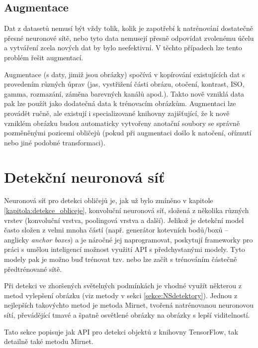 \subsection*{Augmentace}
Dat z datasetů nemusí být vždy tolik, kolik je zapotřebí k natrénování dostatečně přesné neuronové sítě, nebo tyto data nemusejí přesně odpovídat zvolenému účelu a vytváření zcela nových dat by bylo neefektivní. V těchto případech lze tento problém řešit augmentací.

Augmentace (s daty, jimiž jsou obrázky) spočívá v kopírování existujících dat s provedením různých úprav (jas, vystřižení části obrázu, otočení, kontrast, ISO, gamma, rozmazání, záměna barevných kanálů apod.). Takto nově vzniklá data pak lze použít jako dodatečná data k trénovacím obrázkům. Augmentaci lze provádět ručně, ale existují i specializované knihovny zajišťující, že k nově vzniklém obrázku budou automaticky vytvořeny anotační soubory se správně pozměněnými pozicemi obličejů (pokud při augmentaci došlo k natočení, oříznutí nebo jiné podobné transformaci).

\section{Detekční neuronová síť}
\label{sekce:detekcni_sit_navrh}
Neuronová síť pro detekci obličejů je, jak už bylo zmíněno v kapitole \ref{kapitola:detekce_obliceje}, konvoluční neuronová síť, složená z několika různých vrstev (konvoluční vrstva, poolingová vrstva a další). Jelikož je detekční model často složen z velmi mnoha částí (např. generátor kotevních bodů/boxů -- anglicky \emph{anchor boxes}) a je náročné jej naprogramovat, poskytují frameworky pro práci s umělou inteligencí možnost využití API s předchystanými modely. Tyto modely pak je možno buď trénovat tzv.  nebo lze začít s trénováním částečně předtrénované sítě.

Při detekci ve zhoršených světelných podmínkách je vhodné využít některou z metod vylepšení obrázku (viz metody v sekci \ref{sekce:NSdetektory}). Jednou z nejlepších takovýchto metod je metoda Mirnet, tvořená natrénovanou neuronovou sítí, převádějící tmavé a špatně osvětlené obrázky na obrázky s lepší viditelností.

Tato sekce popisuje jak API pro detekci objektů z knihovny TensorFlow, tak detailně také metodu Mirnet.

